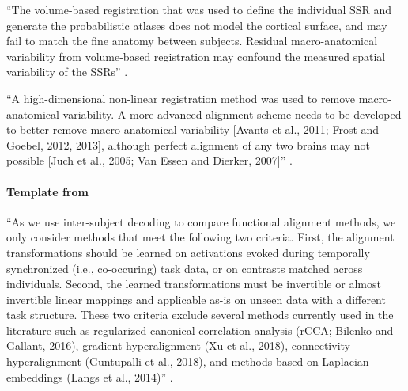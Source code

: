 ``The volume-based registration that was used to define the individual SSR and
generate the probabilistic atlases does not model the cortical surface,
and may fail to match the fine anatomy between subjects.
%
Residual macro-anatomical variability from volume-based registration may
confound the measured spatial variability of the SSRs''
\citep{zhen2017quantifying}.


``A high-dimensional non-linear registration method was used to remove
macro-anatomical variability.
%
A more advanced alignment scheme needs to be developed to better remove
macro-anatomical variability [Avants et al., 2011; Frost and Goebel, 2012,
2013], although perfect alignment of any two brains may not possible [Juch et
al., 2005; Van Essen and Dierker, 2007]'' \citep{zhen2015quantifying}.







\paragraph{Template from \citet{bazeille2021empirical}}
%
``As we use inter-subject decoding to compare functional alignment methods, we
only consider methods that meet the following two criteria.
%
First, the alignment transformations should be learned on activations evoked
during temporally synchronized (i.e., co-occuring) task data, or on contrasts
matched across individuals.
%
Second, the learned transformations must be invertible or almost invertible
linear mappings and applicable as-is on unseen data with a different task
structure.
%
These two criteria exclude several methods currently used in the literature such
as regularized canonical correlation analysis (rCCA; Bilenko and Gallant, 2016),
gradient hyperalignment (Xu et al., 2018), connectivity hyperalignment
(Guntupalli et al., 2018), and methods based on Laplacian embeddings (Langs et
al., 2014)'' \citep{bazeille2021empirical}.

